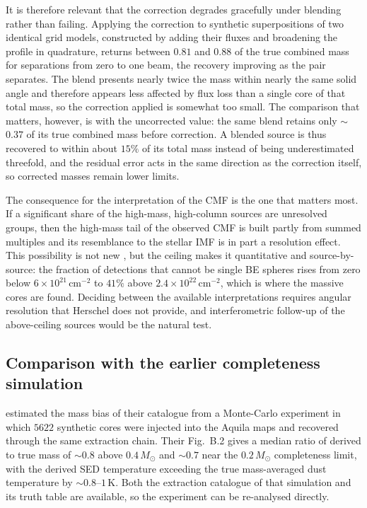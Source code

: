 \documentclass[11pt,a4paper]{article}
\newcommand{\msun}{M_{\odot}}
\begin{document}
It is therefore relevant that the correction degrades gracefully under
blending rather than failing. Applying the correction to synthetic
superpositions of two identical grid models, constructed by adding their
fluxes and broadening the profile in quadrature, returns between $0.81$ and
$0.88$ of the true combined mass for separations from zero to one beam, the
recovery improving as the pair separates. The blend presents nearly twice the
mass within nearly the same solid angle and therefore appears less affected by
flux loss than a single core of that total mass, so the correction applied is
somewhat too small. The comparison that matters, however, is with the
uncorrected value: the same blend retains only $\sim$$0.37$ of its true
combined mass before correction. A blended source is thus recovered to within
about $15\%$ of its total mass instead of being underestimated threefold, and
the residual error acts in the same direction as the correction itself, so
corrected masses remain lower limits.

The consequence for the interpretation of the CMF is the one that matters
most. If a significant share of the high-mass, high-column sources are
unresolved groups, then the high-mass tail of the observed CMF is built partly
from summed multiples and its resemblance to the stellar IMF is in part a
resolution effect. This possibility is not new \citep[][and references
therein]{Konyves+2015}, but the ceiling makes it quantitative and
source-by-source: the fraction of detections that cannot be single BE spheres
rises from zero below $6\times10^{21}\,\mathrm{cm^{-2}}$ to $41\%$ above
$2.4\times10^{22}\,\mathrm{cm^{-2}}$, which is where the massive cores are
found. Deciding between the available interpretations requires angular
resolution that Herschel does not provide, and interferometric follow-up of
the above-ceiling sources would be the natural test.

\subsection{Comparison with the earlier completeness simulation}
\label{sec:why25}

\citet{Konyves+2015} estimated the mass bias of their catalogue from a
Monte-Carlo experiment in which $5622$ synthetic cores were injected into the
Aquila maps and recovered through the same extraction chain. Their Fig.~B.2
gives a median ratio of derived to true mass of $\sim$$0.8$ above
$0.4\,\msun$ and $\sim$$0.7$ near the $0.2\,\msun$ completeness limit, with
the derived SED temperature exceeding the true mass-averaged dust temperature
by $\sim$$0.8$--$1$\,K. Both the extraction catalogue of that simulation and
its truth table are available, so the experiment can be re-analysed directly.
\end{document}
